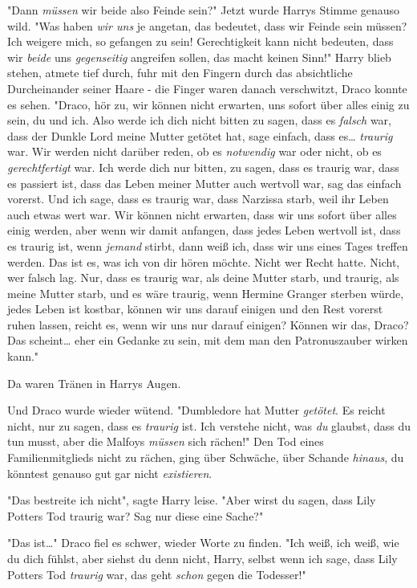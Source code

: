 {"Dann \emph{müssen} wir beide also Feinde sein?" Jetzt wurde Harrys Stimme genauso wild. "Was haben \emph{wir uns} je angetan, das bedeutet, dass wir Feinde sein müssen? Ich weigere mich, so gefangen zu sein! Gerechtigkeit kann nicht bedeuten, dass wir \emph{beide} uns \emph{gegenseitig} angreifen sollen, das macht keinen Sinn!" Harry blieb stehen, atmete tief durch, fuhr mit den Fingern durch das absichtliche Durcheinander seiner Haare - die Finger waren danach verschwitzt, Draco konnte es sehen. "Draco, hör zu, wir können nicht erwarten, uns sofort über alles einig zu sein, du und ich. Also werde ich dich nicht bitten zu sagen, dass es \emph{falsch} war, dass der Dunkle Lord meine Mutter getötet hat, sage einfach, dass es… \emph{traurig} war. Wir werden nicht darüber reden, ob es \emph{notwendig} war oder nicht, ob es \emph{gerechtfertigt} war. Ich werde dich nur bitten, zu sagen, dass es traurig war, dass es passiert ist, dass das Leben meiner Mutter auch wertvoll war, sag das einfach vorerst. Und ich sage, dass es traurig war, dass Narzissa starb, weil ihr Leben auch etwas wert war. Wir können nicht erwarten, dass wir uns sofort über alles einig werden, aber wenn wir damit anfangen, dass jedes Leben wertvoll ist, dass es traurig ist, wenn \emph{jemand} stirbt, dann weiß ich, dass wir uns eines Tages treffen werden. Das ist es, was ich von dir hören möchte. Nicht wer Recht hatte. Nicht, wer falsch lag. Nur, dass es traurig war, als deine Mutter starb, und traurig, als meine Mutter starb, und es wäre traurig, wenn Hermine Granger sterben würde, jedes Leben ist kostbar, können wir uns darauf einigen und den Rest vorerst ruhen lassen, reicht es, wenn wir uns nur darauf einigen? Können wir das, Draco? Das scheint… eher ein Gedanke zu sein, mit dem man den Patronuszauber wirken kann."

Da waren Tränen in Harrys Augen.

Und Draco wurde wieder wütend. "Dumbledore hat Mutter \emph{getötet}. Es reicht nicht, nur zu sagen, dass es \emph{traurig} ist. Ich verstehe nicht, was \emph{du} glaubst, dass du tun musst, aber die Malfoys \emph{müssen} sich rächen!" Den Tod eines Familienmitglieds nicht zu rächen, ging über Schwäche, über Schande \emph{hinaus}, du könntest genauso gut gar nicht \emph{existieren}.

"Das bestreite ich nicht", sagte Harry leise. "Aber wirst du sagen, dass Lily Potters Tod traurig war? Sag nur diese eine Sache?"

"Das ist…" Draco fiel es schwer, wieder Worte zu finden. "Ich weiß, ich weiß, wie du dich fühlst, aber siehst du denn nicht, Harry, selbst wenn ich sage, dass Lily Potters Tod \emph{traurig} war, das geht \emph{schon} gegen die Todesser!"

}
